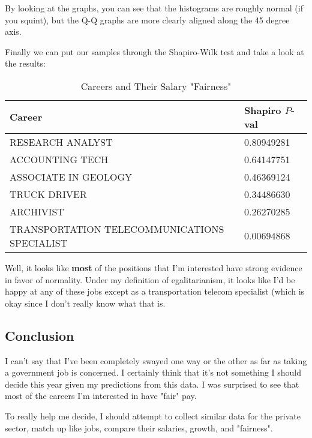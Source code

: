 \documentclass[letterpaper]{article}
\theoremstyle{definition}
\begin{document}
By looking at the graphs, you can see that the histograms are roughly normal (if you
squint), but the Q-Q graphs are more clearly aligned along the 45 degree axis.

Finally we can put our samples through the Shapiro-Wilk test and take a look at the
results:
\begin{table}[htpb]
	\centering
	\caption{Careers and Their Salary "Fairness"}
		\begin{tabular}{ll}
			Career & Shapiro $P$-val\\
		\hline
			 RESEARCH ANALYST                             & 0.80949281\\
			 ACCOUNTING TECH                              & 0.64147751\\
			 ASSOCIATE IN GEOLOGY                         & 0.46369124\\
			 TRUCK DRIVER                                 & 0.34486630\\
			 ARCHIVIST                                    & 0.26270285\\
			 TRANSPORTATION TELECOMMUNICATIONS SPECIALIST & 0.00694868\\
		\end{tabular}
\end{table}



    
    Well, it looks like \textbf{most} of the positions that I'm interested
have strong evidence in favor of normality. Under my definition of
egalitarianism, it looks like I'd be happy at any of these jobs except
as a transportation telecom specialist (which is okay since I don't really know what that
is.

\subsection{Conclusion}

I can't say that I've been completely swayed one way or the other as far as taking a
government job is concerned. I certainly think that it's not something I should decide
this year given my predictions from this data. I was surprised to see that most of the
careers I'm interested in have "fair" pay. 

To really help me decide, I should attempt to collect similar data for the private sector,
match up like jobs, compare their salaries, growth, and "fairness". 

    
\end{document}
